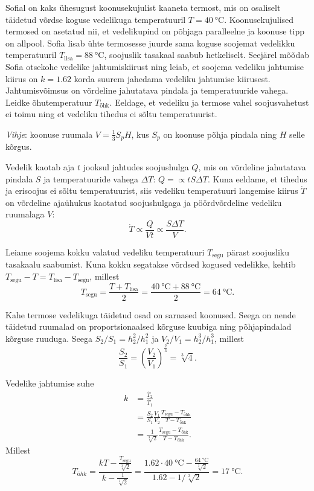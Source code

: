 
Sofial on kaks ühesugust koonusekujulist kaaneta termost, mis on osaliselt täidetud võrdse koguse vedelikuga temperatuuril $T=\SI{40}{\celsius}$. Koonusekujulised termosed on asetatud nii, et vedelikupind on põhjaga paralleelne ja koonuse tipp on allpool. Sofia lisab ühte termosesse juurde sama koguse soojemat vedelikku temperatuuril $T_\text{lisa} = \SI{88}{\celsius}$, soojuslik tasakaal saabub hetkeliselt. Seejärel mõõdab Sofia otsekohe vedelike jahtumiskiirust ning leiab, et soojema vedeliku jahtumise kiirus on $k=\num{1.62}$ korda suurem jahedama vedeliku jahtumise kiirusest. Jahtumisvõimsus on võrdeline jahutatava pindala ja temperatuuride vahega. Leidke õhutemperatuur $T_\text{õhk}$. Eeldage, et vedeliku ja termose vahel soojusvahetust ei toimu ning et vedeliku tihedus ei sõltu temperatuurist.

\textit{Vihje}: koonuse ruumala $V=\frac{1}{3}S_p H$, kus $S_p$ on koonuse põhja pindala ning $H$ selle kõrgus.



\hint

\solu
Vedelik kaotab aja $t$ jooksul jahtudes soojushulga $Q$, mis on võrdeline jahutatava pindala $S$ ja temperatuuride vahega $\Delta T$: $Q = \propto  t S \Delta T$. Kuna eeldame, et tihedus ja erisoojus ei sõltu temperatuurist, siis vedeliku temperatuuri langemise kiirus $\dot{T}$ on võrdeline ajaühukus kaotatud soojushulgaga ja pöördvõrdeline vedeliku ruumalaga $V$:
\[
\dot{T} \propto \frac{Q}{Vt} \propto \frac{S \Delta T}{V}.
\]

Leiame soojema kokku valatud vedeliku temperatuuri $T_\text{segu}$ pärast soojusliku tasakaalu saabumist. Kuna kokku segatakse võrdsed kogused vedelikke, kehtib $T_\text{segu}-T = T_\text{lisa}-T_\text{segu}$, millest
\[
  T_\text{segu} = \frac{T+T_\text{lisa}}{2} = \frac{\SI{40}{\celsius}+\SI{88}{\celsius}}{2}=\SI{64}{\celsius}.
  \]

Kahe termose vedelikuga täidetud osad on sarnased koonused. Seega on nende täidetud ruumalad on proportsionaalsed kõrguse kuubiga ning põhjapindalad kõrguse ruuduga. Seega $S_2/S_1=h_2^2/h_1^2$ ja $V_2/V_1=h_2^3/h_1^3$, millest
\[
  \frac{S_2}{S_1}=\left(\frac{V_2}{V_1}\right)^{\frac{2}{3}} = \sqrt[3]{4}.
\]

Vedelike jahtumise suhe
\begin{align*}
  k &= \frac{\dot{T_2}}{\dot{T_1}} \\
  &= \frac{S_2}{S_1} \frac{V_1}{V_2} \frac{T_\text{segu} - T_\text{õhk}}{T - T_\text{õhk}} \\
    &= \frac{1}{\sqrt[3]{2}}\frac{T_\text{segu} - T_\text{õhk}}{T - T_\text{õhk}}.
\end{align*}
Millest
\[
    T_{õhk} = \frac{k T - \frac{T_\text{segu}}{\sqrt[3]{2}}}{k - \frac{1}{\sqrt[3]{2}}} = \frac{\num{1.62} \cdot \SI{40}{\celsius} - \frac{\SI{64}{\celsius}}{\sqrt[3]{2}}}{\num{1.62} - 1/\sqrt[3]{2}} = \SI{17}{\celsius}.
\]
\probend